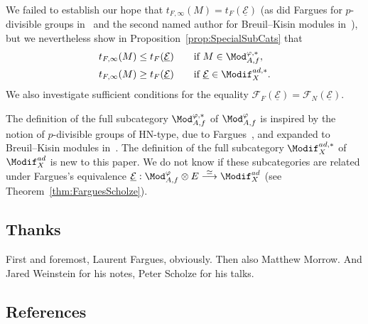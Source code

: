We failed to establish our hope that $t_{F,\infty}(M)=t_{F}(\underline{\mathcal{E}})$ (as did Fargues for $p$-divisible groups in~\cite[Th\'eor\`eme~7]{Fa12} and the second named author for Breuil--Kisin modules in~\cite[Proposition~3.11]{Imp16}), but we nevertheless show in Proposition~\ref{prop:SpecialSubCats} that
\[
\begin{aligned}
t_{F,\infty}(M) & \leq t_{F}(\underline{\mathcal{E}})\quad && \text{if }M\in\Mod_{A,f}^{\varphi,\ast},\\
t_{F,\infty}(M) & \geq t_{F}(\underline{\mathcal{E}}) && \text{if }\underline{\mathcal{E}}\in\Modif_{X}^{ad,\ast}.
\end{aligned}
\]
We also investigate sufficient conditions for the equality $\mathcal{F}_{F}(\underline{\mathcal{E}})=\mathcal{F}_{N}(\underline{\mathcal{E}})$.

\begin{rema}
The definition of the full subcategory $\Mod_{A,f}^{\varphi,\ast}$ of $\Mod_{A,f}^{\varphi}$ is inspired by the notion of $p$-divisible groups of HN-type, due to Fargues~\cite{Fa12}, and expanded to Breuil--Kisin modules in~\cite{Imp16}. The definition of the full subcategory $\Modif_{X}^{ad,\ast}$ of $\Modif_{X}^{ad}$ is new to this paper. We do not know if these subcategories are related under Fargues's equivalence $\underline{\mathcal{E}}:\Mod_{A,f}^{\varphi}\otimes E\stackrel{\simeq}{\longrightarrow}\Modif_{X}^{ad}$ (see Theorem~\ref{thm:FarguesScholze}).
\end{rema}

\subsection{Thanks}

First and foremost, Laurent Fargues, obviously. Then also Matthew Morrow. And Jared Weinstein for his notes, Peter Scholze for his talks.

\subsection{References}

